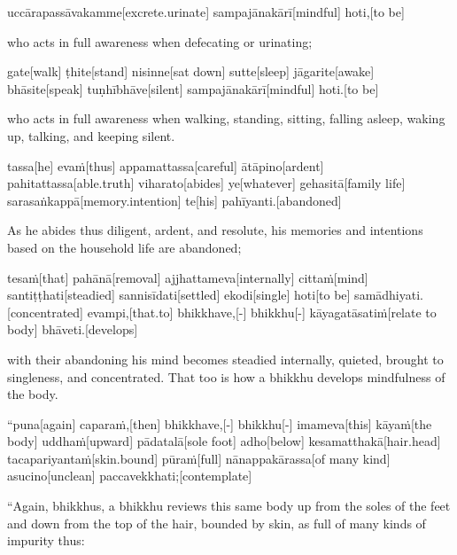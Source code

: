 \begin{samepage}
\begingl[glneveryline={\PaliGlossA,\PaliGlossB}]
uccārapassāvakamme[excrete.urinate] sampajānakārī[mindful] hoti,[to be]
\endgl
\nopagebreak
\linespread{0.5}
\begin{spacin}{0.2}
{\PaliGlossFT who acts in full awareness when defecating or urinating;}
\end{spacin}
\vskip 12pt
\end{samepage}
\begin{samepage}
\begingl[glneveryline={\PaliGlossA,\PaliGlossB}]
gate[walk] ṭhite[stand] nisinne[sat down] sutte[sleep] jāgarite[awake] bhāsite[speak] tuṇhībhāve[silent] sampajānakārī[mindful] hoti.[to be]
\endgl
\nopagebreak
\linespread{0.5}
\begin{spacin}{0.2}
{\PaliGlossFT who acts in full awareness when walking, standing, sitting, falling asleep, waking up, talking, and keeping silent.}
\end{spacin}
\vskip 12pt
\end{samepage}
\begin{samepage}
\begingl[glneveryline={\PaliGlossA,\PaliGlossB}]
tassa[he] evaṁ[thus] appamattassa[careful] ātāpino[ardent] pahitattassa[able.truth] viharato[abides] ye[whatever] gehasitā[family life] sarasaṅkappā[memory.intention] te[his] pahīyanti.[abandoned]
\endgl
\nopagebreak
\linespread{0.5}
\begin{spacin}{0.2}
{\PaliGlossFT As he abides thus diligent, ardent, and resolute, his memories and intentions based on the household life are abandoned;}
\end{spacin}
\vskip 12pt
\end{samepage}
\begin{samepage}
\begingl[glneveryline={\PaliGlossA,\PaliGlossB}]
tesaṁ[that] pahānā[removal] ajjhattameva[internally] cittaṁ[mind] santiṭṭhati[steadied] sannisīdati[settled] ekodi[single] hoti[to be] samādhiyati.[concentrated] evampi,[that.to] bhikkhave,[-] bhikkhu[-] kāyagatāsatiṁ[relate to body] bhāveti.[develops]
\endgl
\nopagebreak
\linespread{0.5}
\begin{spacin}{0.2}
{\PaliGlossFT with their abandoning his mind becomes steadied internally, quieted, brought to singleness, and concentrated. That too is how a bhikkhu develops mindfulness of the body.}
\end{spacin}
\vskip 12pt
\end{samepage}
\vskip 0.2in
\begin{samepage}
\begingl[glneveryline={\PaliGlossA,\PaliGlossB}]
“puna[again] caparaṁ,[then] bhikkhave,[-] bhikkhu[-] imameva[this] kāyaṁ[the body] uddhaṁ[upward] pādatalā[sole foot] adho[below] kesamatthakā[hair.head] tacapariyantaṁ[skin.bound] pūraṁ[full] nānappakārassa[of many kind] asucino[unclean] paccavekkhati;[contemplate]
\endgl
\nopagebreak
\linespread{0.5}
\begin{spacin}{0.2}
{\PaliGlossFT “Again, bhikkhus, a bhikkhu reviews this same body up from the soles of the feet and down from the top of the hair, bounded by skin, as full of many kinds of impurity thus:}
\end{spacin}
\vskip 12pt
\end{samepage}
